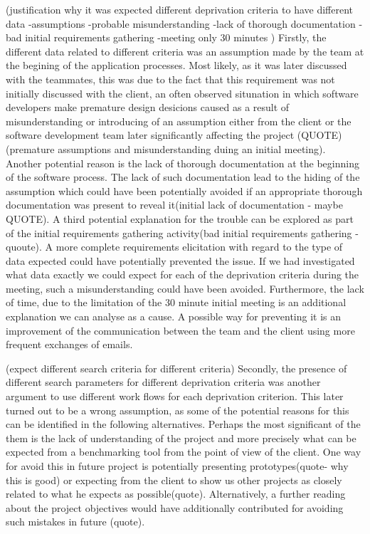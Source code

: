 \documentclass{l3proj}
\begin{document}
(justification why  it was expected different deprivation criteria to have different data
-assumptions
-probable misunderstanding
-lack of thorough documentation
-bad initial requirements gathering
-meeting only 30 minutes
)
Firstly, the different data related to different criteria was an assumption made by the team at the begining of the application processes. Most likely, as it was later discussed with the teammates, this was due to the fact that this requirement was not initially discussed with the client, an often observed situnation in which software developers make premature design desicions caused as a result of misunderstanding or introducing of an assumption either from the client or the software development team later significantly affecting the project (QUOTE)(premature assumptions and misunderstanding duing an initial meeting). Another potential reason is the lack of thorough documentation at the beginning of the software process. The lack of such documentation lead to the hiding of the assumption which could have been potentially avoided if an appropriate thorough documentation was present to reveal it(initial lack of documentation - maybe QUOTE). A third potential explanation for the trouble can be explored as part of the initial requirements gathering activity(bad initial requirements gathering - quoute). A more complete requirements elicitation with regard to the type of data expected could have potentially prevented the issue. If we had investigated what data exactly we could expect for each of the deprivation criteria during the meeting, such a misunderstanding could have been avoided. Furthermore, the lack of time, due to the limitation of the 30 minute initial meeting is an additional explanation we can analyse as a cause. A possible way for preventing it is an improvement of the communication between the team and the client using more frequent exchanges of emails.

(expect different search criteria for different criteria)
Secondly, the presence of different search parameters for different deprivation criteria was another argument to use different work flows for each deprivation criterion. This later turned out to be a wrong assumption, as some of the potential reasons for this can be identified in the following alternatives. Perhaps the most significant of the them is the lack of understanding of the project and more precisely what can be expected from a benchmarking tool from the point of view of the client. One way for avoid this in future project is potentially presenting prototypes(quote- why this is good) or expecting from the client to show us other projects as closely related to what he expects as possible(quote). Alternatively, a further reading about the project objectives would have additionally contributed for avoiding such mistakes in future (quote).
\end{document}
